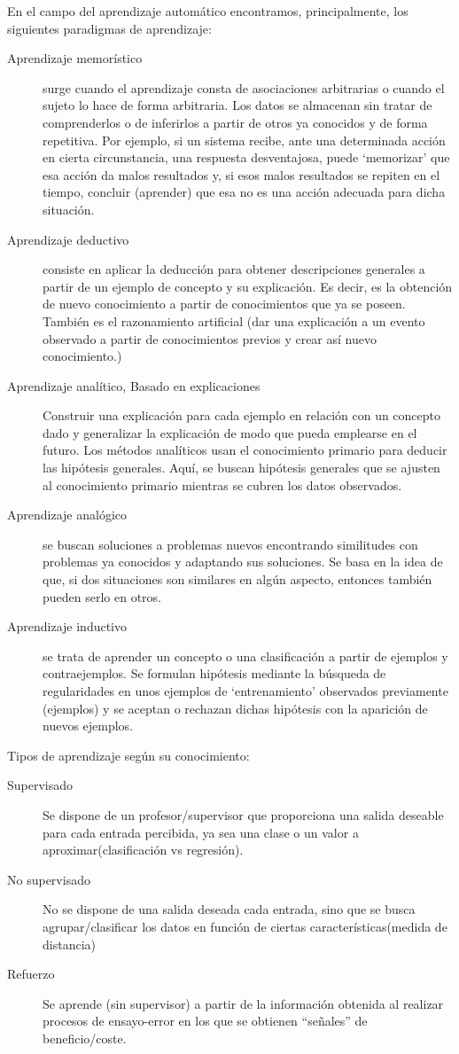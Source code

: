 \documentclass[a4paper, 11pt]{article}
\begin{document}
En el campo del aprendizaje automático encontramos, principalmente, los siguientes paradigmas de aprendizaje:
\begin{description}
	\item[Aprendizaje memorístico] surge cuando el aprendizaje consta de asociaciones arbitrarias o cuando el sujeto lo hace de forma arbitraria. Los datos se almacenan sin tratar de comprenderlos o de inferirlos a partir de otros ya conocidos y de forma repetitiva. Por ejemplo, si un sistema recibe, ante una determinada acción en cierta circunstancia, una respuesta desventajosa, puede `memorizar' que esa acción da malos resultados y, si esos malos resultados se repiten en el tiempo, concluir (aprender) que esa no es una acción adecuada para dicha situación.
	\item[Aprendizaje deductivo] consiste en aplicar la deducción para obtener descripciones generales a partir de un ejemplo de concepto y su explicación. Es decir, es la obtención de nuevo conocimiento a partir de conocimientos que ya se poseen. También es el razonamiento artificial (dar una explicación a un evento observado a partir de conocimientos previos y crear así nuevo conocimiento.)
	\item[Aprendizaje analítico, Basado en explicaciones] Construir una explicación para cada ejemplo en relación con un concepto dado y generalizar la explicación de modo que pueda emplearse en el futuro. Los métodos analíticos usan el conocimiento primario para deducir las hipótesis generales. Aquí, se buscan hipótesis generales que se ajusten al conocimiento primario mientras se cubren los datos observados.
	\item[Aprendizaje analógico] se buscan soluciones a problemas nuevos encontrando similitudes con problemas ya conocidos y adaptando sus soluciones. Se basa en la idea de que, si dos situaciones son similares en algún aspecto, entonces también pueden serlo en otros. 
	\item[Aprendizaje inductivo]  se trata de aprender un concepto o una clasificación a partir de ejemplos y contraejemplos. Se formulan hipótesis mediante la búsqueda de regularidades en unos ejemplos de `entrenamiento' observados previamente (ejemplos) y se aceptan o rechazan dichas hipótesis con la aparición de nuevos ejemplos.
\end{description}

Tipos de aprendizaje según su conocimiento:

\begin{description}
	\item[Supervisado] Se dispone de un profesor/supervisor que proporciona una salida deseable para cada entrada percibida, ya sea una clase o un valor a aproximar(clasificación vs regresión).
	\item[No supervisado] No se dispone de una salida deseada cada entrada, sino que se busca agrupar/clasificar los datos en función de ciertas características(medida de distancia)
	\item[Refuerzo] Se aprende (sin supervisor) a partir de la información obtenida al realizar procesos de ensayo-error en los que se obtienen “señales” de beneficio/coste.
\end{description}
\end{document}
